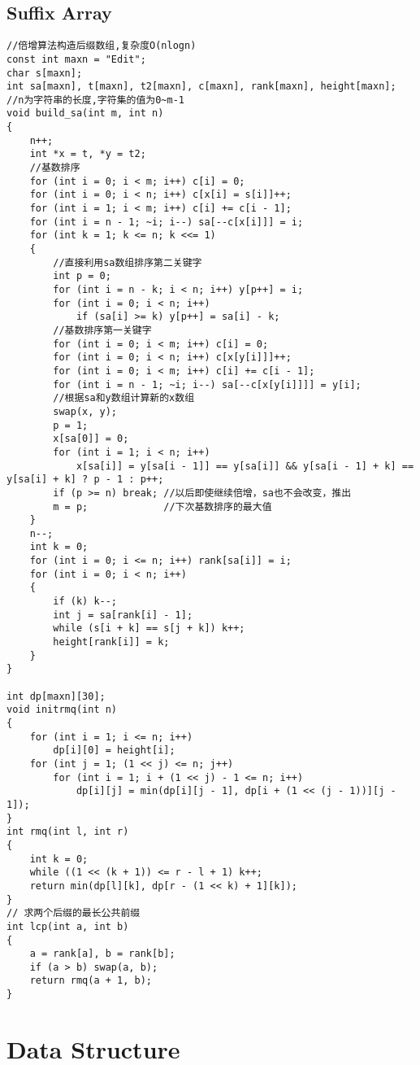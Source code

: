 \documentclass[twoside]{article}
\begin{document}
\subsection{Suffix Array}
\begin{lstlisting}
//倍增算法构造后缀数组,复杂度O(nlogn)
const int maxn = "Edit";
char s[maxn];
int sa[maxn], t[maxn], t2[maxn], c[maxn], rank[maxn], height[maxn];
//n为字符串的长度,字符集的值为0~m-1
void build_sa(int m, int n)
{
    n++;
    int *x = t, *y = t2;
    //基数排序
    for (int i = 0; i < m; i++) c[i] = 0;
    for (int i = 0; i < n; i++) c[x[i] = s[i]]++;
    for (int i = 1; i < m; i++) c[i] += c[i - 1];
    for (int i = n - 1; ~i; i--) sa[--c[x[i]]] = i;
    for (int k = 1; k <= n; k <<= 1)
    {
        //直接利用sa数组排序第二关键字
        int p = 0;
        for (int i = n - k; i < n; i++) y[p++] = i;
        for (int i = 0; i < n; i++)
            if (sa[i] >= k) y[p++] = sa[i] - k;
        //基数排序第一关键字
        for (int i = 0; i < m; i++) c[i] = 0;
        for (int i = 0; i < n; i++) c[x[y[i]]]++;
        for (int i = 0; i < m; i++) c[i] += c[i - 1];
        for (int i = n - 1; ~i; i--) sa[--c[x[y[i]]]] = y[i];
        //根据sa和y数组计算新的x数组
        swap(x, y);
        p = 1;
        x[sa[0]] = 0;
        for (int i = 1; i < n; i++)
            x[sa[i]] = y[sa[i - 1]] == y[sa[i]] && y[sa[i - 1] + k] == y[sa[i] + k] ? p - 1 : p++;
        if (p >= n) break; //以后即使继续倍增，sa也不会改变，推出
        m = p;             //下次基数排序的最大值
    }
    n--;
    int k = 0;
    for (int i = 0; i <= n; i++) rank[sa[i]] = i;
    for (int i = 0; i < n; i++)
    {
        if (k) k--;
        int j = sa[rank[i] - 1];
        while (s[i + k] == s[j + k]) k++;
        height[rank[i]] = k;
    }
}

int dp[maxn][30];
void initrmq(int n)
{
    for (int i = 1; i <= n; i++)
        dp[i][0] = height[i];
    for (int j = 1; (1 << j) <= n; j++)
        for (int i = 1; i + (1 << j) - 1 <= n; i++)
            dp[i][j] = min(dp[i][j - 1], dp[i + (1 << (j - 1))][j - 1]);
}
int rmq(int l, int r)
{
    int k = 0;
    while ((1 << (k + 1)) <= r - l + 1) k++;
    return min(dp[l][k], dp[r - (1 << k) + 1][k]);
}
// 求两个后缀的最长公共前缀
int lcp(int a, int b)
{
    a = rank[a], b = rank[b];
    if (a > b) swap(a, b);
    return rmq(a + 1, b);
}
\end{lstlisting}
\clearpage\section{Data Structure}
\end{document}
